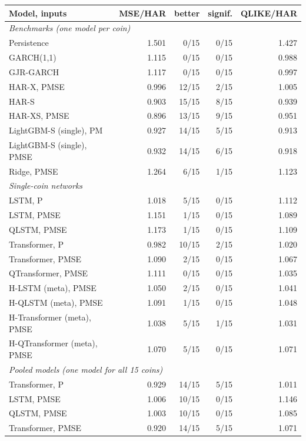 \begin{tabular}{lrrrr}
\toprule
Model, inputs & MSE/HAR & better & signif. & QLIKE/HAR \\
\midrule
\multicolumn{5}{l}{\emph{Benchmarks (one model per coin)}} \\
Persistence & 1.501 & 0/15 & 0/15 & 1.427 \\
GARCH(1,1) & 1.115 & 0/15 & 0/15 & 0.988 \\
GJR-GARCH & 1.117 & 0/15 & 0/15 & 0.997 \\
HAR-X, PMSE & 0.996 & 12/15 & 2/15 & 1.005 \\
HAR-S & 0.903 & 15/15 & 8/15 & 0.939 \\
HAR-XS, PMSE & 0.896 & 13/15 & 9/15 & 0.951 \\
LightGBM-S (single), PM & 0.927 & 14/15 & 5/15 & 0.913 \\
LightGBM-S (single), PMSE & 0.932 & 14/15 & 6/15 & 0.918 \\
Ridge, PMSE & 1.264 & 6/15 & 1/15 & 1.123 \\
\midrule
\multicolumn{5}{l}{\emph{Single-coin networks}} \\
LSTM, P & 1.018 & 5/15 & 0/15 & 1.112 \\
LSTM, PMSE & 1.151 & 1/15 & 0/15 & 1.089 \\
QLSTM, PMSE & 1.173 & 1/15 & 0/15 & 1.109 \\
Transformer, P & 0.982 & 10/15 & 2/15 & 1.020 \\
Transformer, PMSE & 1.090 & 2/15 & 0/15 & 1.067 \\
QTransformer, PMSE & 1.111 & 0/15 & 0/15 & 1.035 \\
H-LSTM (meta), PMSE & 1.050 & 2/15 & 0/15 & 1.041 \\
H-QLSTM (meta), PMSE & 1.091 & 1/15 & 0/15 & 1.048 \\
H-Transformer (meta), PMSE & 1.038 & 5/15 & 1/15 & 1.031 \\
H-QTransformer (meta), PMSE & 1.070 & 5/15 & 0/15 & 1.071 \\
\midrule
\multicolumn{5}{l}{\emph{Pooled models (one model for all 15 coins)}} \\
Transformer, P & 0.929 & 14/15 & 5/15 & 1.011 \\
LSTM, PMSE & 1.006 & 10/15 & 0/15 & 1.146 \\
QLSTM, PMSE & 1.003 & 10/15 & 0/15 & 1.085 \\
Transformer, PMSE & 0.920 & 14/15 & 5/15 & 1.071 \\

\end{tabular}
